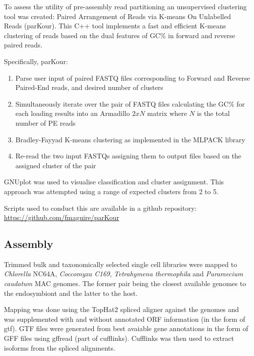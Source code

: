 To assess the utility of pre-assembly read partitioning an unsupervised clustering tool was created:
Paired Arrangement of Reads via K-means On Unlabelled Reads (parKour).
This C++ tool implements a fast and efficient K-means clustering of reads based on the dual features
of GC\% in forward and reverse paired reads.

Specifically, parKour:
\begin{enumerate}
    \item Parse user input of paired FASTQ files corresponding to Forward and Reverse Paired-End reads, and desired number of clusters
    \item Simultaneously iterate over the pair of FASTQ files calculating the GC\% for each loading results into an Armadillo \(2xN\) matrix \citep{Sanderson2010} where \(N\) is the total number of PE reads
    \item Bradley-Fayyad K-means \citep{Bradley1998} clustering as implemented in the MLPACK library \citep{mlpack2013}
    \item Re-read the two input FASTQs assigning them to output files based on the assigned cluster of the pair
\end{enumerate}

GNUplot \citep{Gnuplot_4.4} was used to visualise classification and cluster assignment.
This approach was attempted using a range of expected clusters from 2 to 5.

Scripts used to conduct this are available in a github repository:
\url{https://github.com/fmaguire/parKour}


\subsection{Assembly}

Trimmed bulk and taxonomically selected single cell libraries
were mapped to \textit{Chlorella} NC64A, \textit{Coccomyxa C169}, 
\textit{Tetrahymena thermophila} and \textit{Paramecium caudatum} MAC genomes.
The former pair being the closest available genomes to the endosymbiont and the latter to the host.

Mapping was done using the TopHat2 spliced aligner \citep{Kim2013} against
the genomes and was supplemented with and without annotated ORF information (in the form of gtf).
GTF files were generated from best avaiable gene annotations in the form of GFF files using gffread (part of
cufflinks).
Cufflinks \citep{Trapnell2011} was then used to extract isoforms from the spliced alignments.


